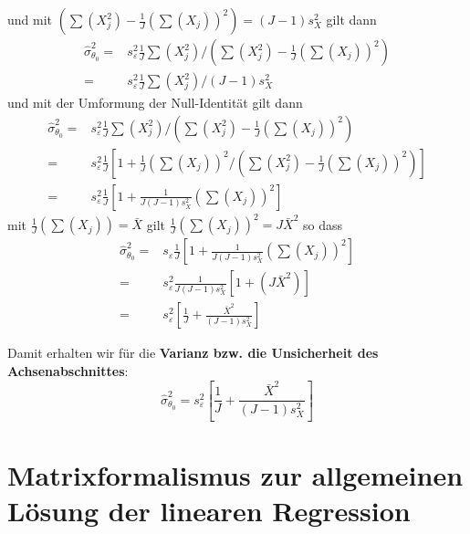 und mit $(\sum(X_j^2) - \frac{1}{J}(\sum(X_j))^2) = (J-1) s_X^2$ gilt dann
\begin{align}
\hat \sigma^2_{\theta_0} =& 
s^2_{\varepsilon} \frac{1}{J} \sum(X_j^2)  / (\sum(X_j^2) - \frac{1}{J}(\sum(X_j))^2) \\
=& s^2_{\varepsilon} \frac{1}{J} \sum(X_j^2)  / (J-1) s_X^2
\end{align}
und mit der Umformung der Null-Identität gilt dann
\begin{align}
\hat \sigma^2_{\theta_0} 
=& s^2_{\varepsilon} \frac{1}{J} \sum(X_j^2)  / (\sum(X_j^2) - \frac{1}{J}(\sum(X_j))^2) \\
=& s^2_{\varepsilon} \frac{1}{J} \left[ 1 + \frac{1}{J}(\sum(X_j))^2 / (\sum(X_j^2) - \frac{1}{J}(\sum(X_j))^2) \right] \\
=& s^2_{\varepsilon} \frac{1}{J} \left[ 1 + \frac{1}{J(J-1) s_X^2} \left(\sum(X_j)\right)^2 \right]  
\end{align}
mit $\frac{1}{J}(\sum(X_j)) = \bar X$ gilt $\frac{1}{J}(\sum(X_j))^2 = J \bar X^2$
so dass
\begin{align}
\hat \sigma^2_{\theta_0} =& s_{\varepsilon} \frac{1}{J} \left[ 1 + 
\frac{1}{J (J-1) s_X^2} \left(\sum(X_j) \right)^2 \right] \\
=& s^2_{\varepsilon} \frac{1}{J(J-1) s_X^2} \left[ 1 + (J \bar X^2) \right] \\
=&
s^2_{\varepsilon}  \left[\frac{1}{J} + \frac{\bar X^2}{(J-1) s_X^2} \right]
\end{align}

Damit erhalten wir für die \textbf{Varianz bzw. die Unsicherheit des Achsenabschnittes}: 
\begin{equation}
\hat \sigma^2_{\theta_0} =
s^2_{\varepsilon}  \left[ \frac{1}{J} +\frac{\bar {X}^2}{(J - 1) s_X^2 } \right]
\end{equation}

\section{Matrixformalismus zur allgemeinen Lösung der linearen Regression}

